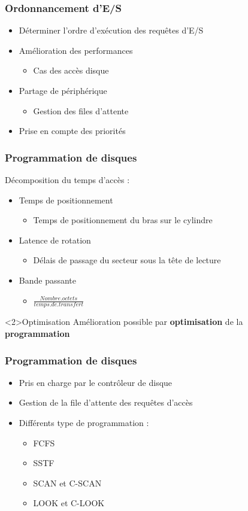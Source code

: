 \begin{frame}
\frametitle{Ordonnancement d'E/S}
\begin{itemize}
\item Déterminer l'ordre d'exécution des requêtes d'E/S
\item Amélioration des performances
\begin{itemize}
\item Cas des accès disque
\end{itemize}
\item Partage de périphérique
\begin{itemize}
\item Gestion des files d'attente
\end{itemize}
\item Prise en compte des priorités
\end{itemize}
\end{frame}


\begin{frame}
\frametitle{Programmation de disques}
Décomposition du temps d'accès :
\begin{itemize}
\item Temps de positionnement
\begin{itemize}
\item Temps de positionnement du bras sur le cylindre
\end{itemize}
\item Latence de rotation
\begin{itemize}
\item Délais de passage du secteur sous la tête de lecture
\end{itemize}
\item Bande passante
\begin{itemize}
\item $\frac{Nombre.octets}{temps.de.transfert}$
\end{itemize}
\end{itemize}

\begin{block}<2>{Optimisation}
Amélioration possible par \textbf{optimisation} de la \textbf{programmation}
\end{block}
\end{frame}

\begin{frame}
\frametitle{Programmation de disques}
\begin{itemize}
\item Pris en charge par le contrôleur de disque
\item Gestion de la file d'attente des requêtes d'accès
\item Différents type de programmation :
\begin{itemize}
\item FCFS
\item SSTF
\item SCAN et C-SCAN
\item LOOK et C-LOOK
\end{itemize}
\end{itemize}
\end{frame}

